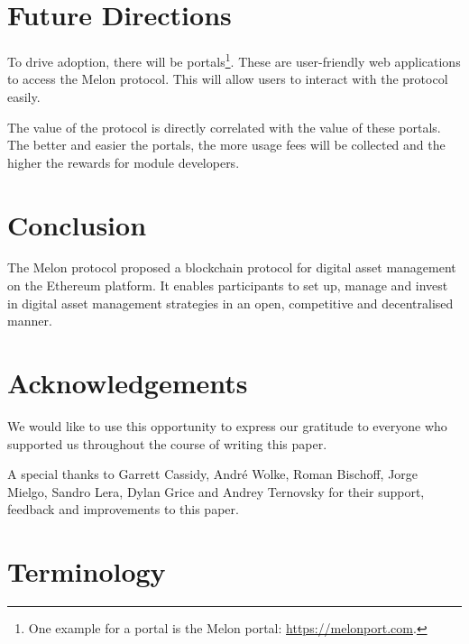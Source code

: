 \documentclass[9pt,oneside]{amsart}
\theoremstyle{plain}
\begin{document}
\begin{multicols}{2}
\section{Future Directions}\label{sec:futuredirections}

To drive adoption, there will be portals\footnote{One example for a portal is the Melon portal: \url{https://melonport.com}.}. These are user-friendly web applications to access the Melon protocol. This will allow users to interact with the protocol easily.

The value of the protocol is directly correlated with the value of these portals. The better and easier the portals, the more usage fees will be collected and the higher the rewards for module developers.

\section{Conclusion}\label{sec:conc}

The Melon protocol proposed a blockchain protocol for digital asset management on the Ethereum platform. It enables participants to set up, manage and invest in digital asset management strategies in an open, competitive and decentralised manner.

\section{Acknowledgements}

We would like to use this opportunity to express our gratitude to everyone who supported us throughout the course of writing this paper.

A special thanks to Garrett Cassidy, André Wolke, Roman Bischoff, Jorge Mielgo, Sandro Lera, Dylan Grice and Andrey Ternovsky for their support, feedback and improvements to this paper.



\end{multicols}

\appendix

\section{Terminology}\label{app:term}
\end{document}
